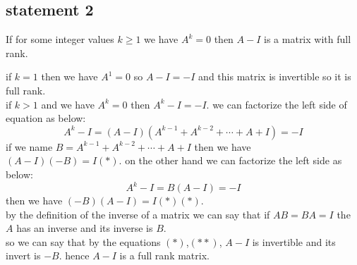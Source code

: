 \subsection{statement 2}
If for some integer values $k \geq 1$ we have $A^k = 0$ then $A-I$ is a matrix with full rank.
\begin{qsolve}
	\begin{qsolve}[]
		if $k=1$ then we have $A^1 = 0$ so $A-I = -I$ and this matrix is invertible so it is full rank.\\
		if $k > 1$ and we have $A^k = 0$ then $A^k - I = -I$. we can factorize the left side of equation as below:
		$$A^k - I = (A-I)(A^{k-1} + A^{k-2} + \cdots + A + I) = -I$$ if we name $B = A^{k-1} + A^{k-2} + \cdots + A + I$ then we have $(A-I)(-B) = I (\ast)$. on the other hand we can factorize the left side as below:
		$$A^k - I = B(A-I) = -I$$ 
		\splitqsolve[\splitqsolve]
		then we have $(-B)(A-I) = I (\ast)(\ast)$.\\
		by the definition of the inverse of a matrix we can say that if $AB = BA = I$ the $A$ has an inverse and its inverse is $B$.\\
		so we can say that by the equations $(\ast)$,$(\ast \ast)$, $A-I$ is invertible and its invert is $-B$. hence $A-I$ is a full rank matrix.
	\end{qsolve}
\end{qsolve}
